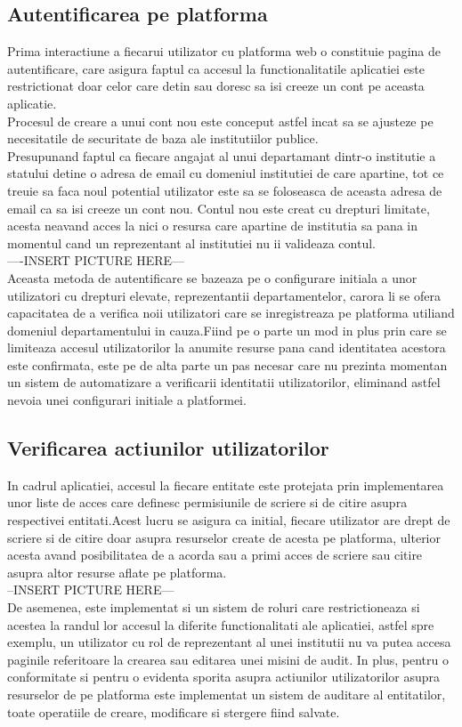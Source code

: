 \subsection{Autentificarea pe platforma}
Prima interactiune a fiecarui utilizator cu platforma web o constituie pagina de autentificare, care asigura faptul ca accesul la functionalitatile aplicatiei este restrictionat doar celor care detin sau doresc sa isi creeze un cont pe aceasta aplicatie.\\
Procesul de creare a unui cont nou este conceput astfel incat sa se ajusteze pe necesitatile de securitate de baza ale institutiilor publice.\\
 Presupunand faptul ca fiecare angajat al unui departamant dintr-o institutie a statului detine o adresa de email cu domeniul institutiei de care apartine, tot ce treuie sa faca noul potential utilizator este sa se foloseasca de aceasta adresa de email ca sa isi creeze un cont nou. Contul nou este creat cu drepturi limitate, acesta neavand acces la nici o resursa care apartine de institutia sa pana in momentul cand un reprezentant al institutiei nu ii valideaza contul.\\
 ----INSERT PICTURE HERE---\\
Aceasta metoda de autentificare se bazeaza pe o  configurare initiala a unor utilizatori cu drepturi elevate, reprezentantii departamentelor, carora li se ofera capacitatea de a verifica noii utilizatori care se inregistreaza pe platforma utiliand domeniul departamentului in cauza.Fiind pe o parte un mod in plus prin care se limiteaza accesul utilizatorilor la anumite resurse pana cand identitatea acestora este confirmata, este pe de alta parte un pas necesar care nu prezinta momentan un sistem de automatizare a verificarii identitatii utilizatorilor, eliminand astfel nevoia unei configurari initiale a platformei.

\subsection{Verificarea actiunilor utilizatorilor}
In cadrul aplicatiei, accesul la fiecare entitate este protejata prin implementarea unor liste de acces care definesc permisiunile de scriere si de citire asupra respectivei entitati.Acest lucru se asigura ca initial, fiecare utilizator are drept de scriere si de citire doar asupra resurselor create de acesta pe platforma, ulterior acesta avand posibilitatea de a acorda sau a primi acces de scriere sau citire asupra altor resurse aflate pe platforma.\\
	--INSERT PICTURE HERE---\\
De asemenea, este implementat si un sistem de roluri care restrictioneaza si acestea la randul lor accesul la diferite functionalitati ale aplicatiei, astfel spre exemplu, un utilizator cu rol de reprezentant al unei institutii nu va putea accesa paginile referitoare la crearea sau editarea unei misini de audit.
In plus, pentru o conformitate si pentru o evidenta sporita asupra actiunilor utilizatorilor asupra resurselor de pe platforma este implementat un sistem de auditare al entitatilor, toate operatiile de creare, modificare si stergere fiind salvate.


